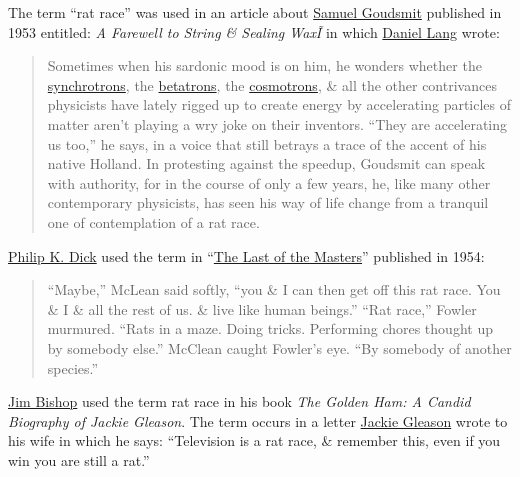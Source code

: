 \documentclass{article}
\begin{document}
The term ``rat race'' was used in an article about \href{https://en.wikipedia.org/wiki/Samuel_Goudsmit}{\sc Samuel Goudsmit} published in 1953 entitled: {\it A Farewell to String \& Sealing Wax\~I} in which \href{https://en.wikipedia.org/wiki/Daniel_Lang_(writer)}{\sc Daniel Lang} wrote:
\begin{quote}
	Sometimes when his sardonic mood is on him, he wonders whether the \href{https://en.wikipedia.org/wiki/Synchrotron}{synchrotrons}, the \href{https://en.wikipedia.org/wiki/Betatron}{betatrons}, the \href{https://en.wikipedia.org/wiki/Cosmotron}{cosmotrons}, \& all the other contrivances physicists have lately rigged up to create energy by accelerating particles of matter aren't playing a wry joke on their inventors. ``They are accelerating us too,'' he says, in a voice that still betrays a trace of the accent of his native Holland. In protesting against the speedup, {\sc Goudsmit} can speak with authority, for in the course of only a few years, he, like many other contemporary physicists, has seen his way of life change from a tranquil one of contemplation of a rat race.
\end{quote}
\href{https://en.wikipedia.org/wiki/Philip_K._Dick}{\sc Philip K. Dick} used the term in ``\href{https://en.wikipedia.org/wiki/The_Last_of_the_Masters}{The Last of the Masters}'' published in 1954:
\begin{quote}
	``Maybe,'' McLean said softly, ``you \& I can then get off this rat race. You \& I \& all the rest of us. \& live like human beings.'' ``Rat race,'' Fowler murmured. ``Rats in a maze. Doing tricks. Performing chores thought up by somebody else.'' McClean caught Fowler's eye. ``By somebody of another species.''
\end{quote}
\href{https://en.wikipedia.org/wiki/Jim_Bishop}{\sc Jim Bishop} used the term rat race in his book {\it The Golden Ham: A Candid Biography of Jackie Gleason}. The term occurs in a letter \href{https://en.wikipedia.org/wiki/Jackie_Gleason}{\sc Jackie Gleason} wrote to his wife in which he says: ``Television is a rat race, \& remember this, even if you win you are still a rat.''
\end{document}
